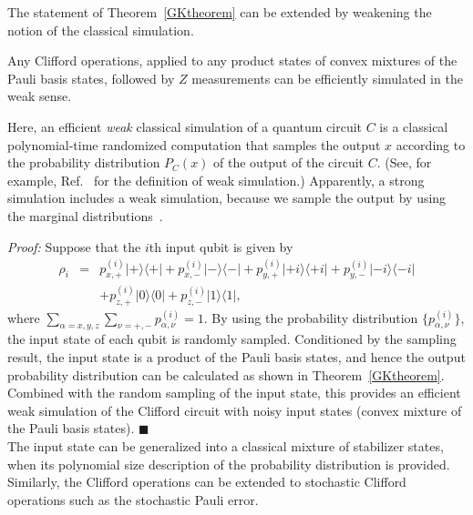 The statement of Theorem~\ref{GKtheorem} can be extended by weakening the notion of the classical simulation.
\begin{theorem}
Any Clifford operations, applied to any product states of convex mixtures of the Pauli basis states, followed by $Z$ measurements can be efficiently simulated in the weak sense.
\label{GKtheorem_mix}
\end{theorem}
Here, an efficient {\it weak} classical simulation of a quantum circuit $C$ is a classical polynomial-time randomized computation that samples the output $x$ according to the probability distribution $P_{C}(x)$ of the output of the circuit $C$. 
(See, for example, Ref.~\cite{IQP} for the definition of weak simulation.)
Apparently, a strong simulation includes a weak simulation, because we sample the output by using the marginal distributions~\cite{TerhalDiVincenzo}.

{\it Proof:}
Suppose that the $i$th input qubit is given by
\begin{eqnarray}
\rho _{i} &=& p^{(i)}_{x,+} |+\rangle \langle +| +p^{(i)}_{x,-} |-\rangle \langle -| +p^{(i)}_{y,+} |+i\rangle \langle +i| +p^{(i)}_{y,-} |-i\rangle \langle -i|
\nonumber \\
&&+p^{(i)}_{z,+} |0\rangle\langle0|+ p^{(i)}_{z,-} |1\rangle \langle 1|,
\end{eqnarray}
where $\sum _{\alpha =x,y,z} \sum _{\nu = +,-} p_{\alpha , \nu}^{(i)}=1$.
By using the probability distribution $\{p_{\alpha , \nu}^{(i)} \}$, the input state of each qubit is randomly sampled.
Conditioned by the sampling result, the input state is a product of the Pauli basis states, and hence the output probability distribution can be calculated as shown in Theorem~\ref{GKtheorem}.
Combined with the random sampling of the input state, this provides an efficient weak simulation of the Clifford circuit with noisy input states (convex mixture of the Pauli basis states).
\hfill $\blacksquare$
\\
The input state can be generalized into a classical mixture of stabilizer states, when its polynomial size description of the probability distribution is provided. 
Similarly, the Clifford operations can be extended to stochastic Clifford operations such as the stochastic Pauli error.

